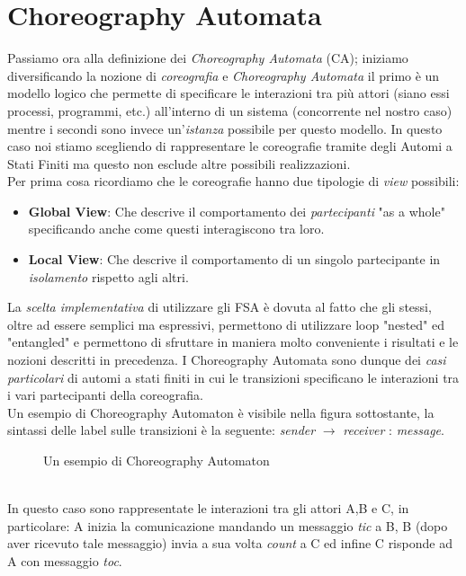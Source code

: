 \section{Choreography Automata}
Passiamo ora alla definizione dei \emph{Choreography Automata} (CA); iniziamo diversificando la nozione di \emph{coreografia} e \emph{Choreography Automata}\cite{Choreography_Automata} il primo è un modello logico che permette di specificare le interazioni tra più attori (siano essi processi, programmi, etc.) all'interno di un sistema (concorrente nel nostro caso) mentre i secondi sono invece un'\emph{istanza} possibile per questo modello. In questo caso noi stiamo scegliendo di rappresentare le coreografie tramite degli Automi a Stati Finiti ma questo non esclude altre possibili realizzazioni.\\
Per prima cosa ricordiamo che le coreografie hanno due tipologie di \emph{view} possibili:
\begin{itemize}
    \item \textbf{Global View}: Che descrive il comportamento dei \emph{partecipanti} "as a whole" specificando anche come questi interagiscono tra loro.
    \item \textbf{Local View}: Che descrive il comportamento di un singolo partecipante in \emph{isolamento} rispetto agli altri.
\end{itemize}
La \emph{scelta implementativa} di utilizzare gli FSA è dovuta al fatto che gli stessi, oltre ad essere semplici ma espressivi, permettono di utilizzare loop "nested" ed "entangled" e permettono di sfruttare in maniera molto conveniente i risultati e le nozioni descritti in precedenza. I Choreography Automata sono dunque dei \emph{casi particolari} di automi a stati finiti in cui le transizioni specificano le interazioni tra i vari partecipanti della coreografia.\\
Un esempio di Choreography Automaton è visibile nella figura sottostante, la sintassi delle label sulle transizioni è la seguente: \emph{sender} $\rightarrow$ \emph{receiver} : \emph{message}.
\begin{figure}[ht]
    \centering
    \caption{Un esempio di Choreography Automaton}
    \label{fig:ChoreographyAutomata_Example}
\end{figure}\\
In questo caso sono rappresentate le interazioni tra gli attori A,B e C, in particolare: A inizia la comunicazione mandando un messaggio \emph{tic} a B, B (dopo aver ricevuto tale messaggio) invia a sua volta \emph{count} a C ed infine C risponde ad A con messaggio \emph{toc}.

